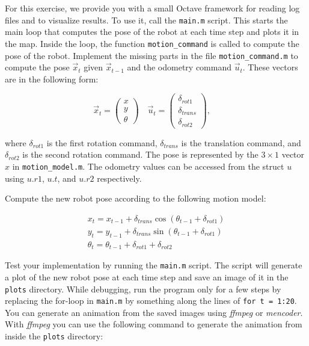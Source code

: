 \documentclass[12pt,a4paper]{article}
\begin{document}
For this exercise, we provide you with a small Octave framework for
reading log files and to visualize results.  To use it, call the
\texttt{main.m} script. This starts the main loop that computes the pose
of the robot at each time step and plots it in the map. Inside the loop,
the function \texttt{motion\_command} is called to compute the pose of
the robot. Implement the missing parts in the file
\texttt{motion\_command.m} to compute the pose $\vec x_t$ given $\vec
x_{t-1}$ and the odometry command $\vec u_t$. These vectors are in the
following form:

\begin{equation*}
      \vec x_t = \left(\begin{array}{c} x \\ y \\ \theta \end{array}\right) \quad
      \vec u_t = \left(\begin{array}{c} \delta_{rot1} \\ \delta_{trans} \\ \delta_{rot2} \end{array}\right), \quad
\end{equation*}

where $\delta_{rot1}$ is the first rotation command, $\delta_{trans}$ is
the translation command, and $\delta_{rot2}$ is the second rotation
command. The pose is represented by the $3\times1$ vector $x$ in
\texttt{motion\_model.m}. The odometry values can be accessed from the
struct $u$ using $u.r1$, $u.t$, and $u.r2$ respectively.

Compute the new robot pose according to the following motion model:

\begin{equation*}
     \begin{array}{l}
     x_t = x_{t-1} + \delta_{trans} \cos(\theta_{t-1} + \delta_{rot1}) \\
     y_t = y_{t-1} + \delta_{trans} \sin(\theta_{t-1} + \delta_{rot1}) \\
     \theta_t = \theta_{t-1} + \delta_{rot1} + \delta_{rot2}
     \end{array}
\end{equation*}

Test your implementation by running the \texttt{main.m} script. The
script will generate a plot of the new robot pose at each time step and
save an image of it in the \texttt{plots} directory.  While debugging,
run the program only for a few steps by replacing the for-loop in
\texttt{main.m} by something along the lines of \texttt{for t = 1:20}.
You can generate an animation from the saved images using \emph{ffmpeg}
or \emph{mencoder}.  With \emph{ffmpeg} you can use the following
command to generate the animation from inside the \texttt{plots}
directory:
\end{document}
